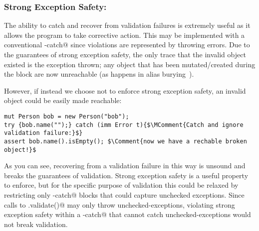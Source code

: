 %
%

\subsubsection*{Strong Exception Safety:}
The ability to catch and recover from validation failures is extremely useful as it allows the program to take corrective action.
This may be implemented with a conventional \Q@try-catch@ since violations are represented by throwing errors.
 Due to the guarantees of strong exception safety, the only trace that the invalid object existed is the exception thrown; any object that has been mutated/created during the \Q@try@ block are now unreachable (as happens in alias burying~\cite{boyland2001alias}).

However, if instead we choose not to enforce strong exception safety, an invalid object could be easily made reachable:
\saveSpace
\begin{lstlisting}
mut Person bob = new Person("bob");
try {bob.name("");} catch (imm Error t){$\MComment{Catch and ignore validation failure:}$}
assert bob.name().isEmpty(); $\Comment{now we have a rechable broken object!}$

\end{lstlisting}
\saveSpace
As you can see, recovering from a validation failure in this way is unsound and breaks the guarantees of validation.
Strong exception safety is a useful property to enforce, but for the specific purpose of validation this could be relaxed by restricting only \Q@try-catch@ blocks that could capture unchecked exceptions.
Since calls to \Q@.validate()@ may only throw unchecked-exceptions, violating strong exception safety within a \Q@try-catch@ that cannot catch unchecked-exceptions would not break validation.

